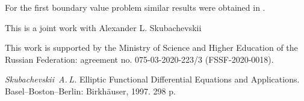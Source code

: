 \documentclass[12pt]{llncs}
\begin{document}
\par For the first boundary value problem similar results were obtained in \cite{ivan_1}.
\bigskip
\par This is a joint work with Alexander L. Skubachevskii
\bigskip
\par This work is supported by  the Ministry of Science and Higher Education of the Russian Federation: agreement no. 075-03-2020-223/3 (FSSF-2020-0018).

\begin{thebibliography}{4} %
 {\it Skubachevskii~A.\,L.} Elliptic Functional
Differential Equations and Applications.    Basel--Boston--Berlin:
Birkh\"auser, 1997.   298 p.

\end{thebibliography}

\end{document}

